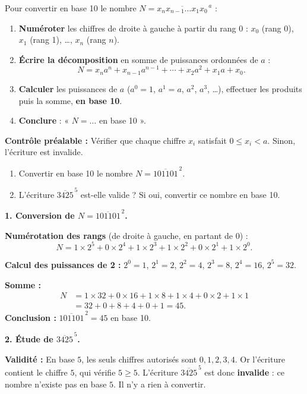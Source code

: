 \documentclass[11pt]{article}
\begin{document}
\begin{methode}
Pour convertir en base 10 le nombre $N = \overline{x_n x_{n-1} \ldots x_1 x_0}^{\,a}$ :
\begin{enumerate}
\item \textbf{Numéroter} les chiffres de droite à gauche à partir du rang $0$ : $x_0$ (rang 0), $x_1$ (rang 1), \ldots, $x_n$ (rang $n$).
\item \textbf{Écrire la décomposition} en somme de puissances ordonnées de $a$ :
\[ N = x_n a^n + x_{n-1} a^{n-1} + \cdots + x_2 a^2 + x_1 a + x_0. \]
\item \textbf{Calculer} les puissances de $a$ ($a^0 = 1$, $a^1 = a$, $a^2$, $a^3$, \ldots), effectuer les produits puis la somme, \textbf{en base 10}.
\item \textbf{Conclure} : « $N = \ldots$ en base 10 ».
\end{enumerate}
\textbf{Contrôle préalable :} Vérifier que chaque chiffre $x_i$ satisfait $0 \leq x_i < a$. Sinon, l'écriture est invalide.
\end{methode}

\begin{exoresolu}
\begin{enumerate}
\item Convertir en base 10 le nombre $N = \overline{101101}^{\,2}$.
\item L'écriture $\overline{3425}^{\,5}$ est-elle valide ? Si oui, convertir ce nombre en base 10.
\end{enumerate}
\tcblower
\textbf{1. Conversion de $N = \overline{101101}^{\,2}$.}

\textbf{Numérotation des rangs} (de droite à gauche, en partant de $0$) :
\[ N = 1 \times 2^5 + 0 \times 2^4 + 1 \times 2^3 + 1 \times 2^2 + 0 \times 2^1 + 1 \times 2^0. \]

\textbf{Calcul des puissances de 2 :} $2^0 = 1$, $2^1 = 2$, $2^2 = 4$, $2^3 = 8$, $2^4 = 16$, $2^5 = 32$.

\textbf{Somme :}
\begin{align*}
N &= 1 \times 32 + 0 \times 16 + 1 \times 8 + 1 \times 4 + 0 \times 2 + 1 \times 1 \\
&= 32 + 0 + 8 + 4 + 0 + 1 = 45.
\end{align*}
\textbf{Conclusion :} $\overline{101101}^{\,2} = 45$ en base 10.

\textbf{2. Étude de $\overline{3425}^{\,5}$.}

\textbf{Validité :} En base $5$, les seuls chiffres autorisés sont $0, 1, 2, 3, 4$. Or l'écriture contient le chiffre $5$, qui vérifie $5 \geq 5$. L'écriture $\overline{3425}^{\,5}$ est donc \textbf{invalide} : ce nombre n'existe pas en base $5$. Il n'y a rien à convertir.
\end{exoresolu}
\end{document}
